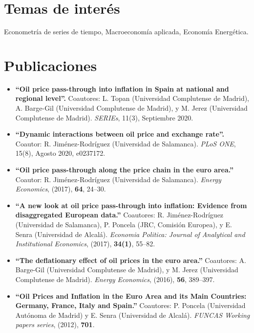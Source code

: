 \documentclass[11pt]{article}\usepackage[]{graphicx}\usepackage[]{color}
\begin{document}
{%
\section{Temas de interés}

Econometría de series de tiempo, Macroeconomía aplicada, Economía Energética.

\section{Publicaciones}

\begin{itemize}
  \item \textbf{``Oil price pass-through into inflation in Spain at national and regional level''.} Coautores: L. Topan (Universidad Complutense de Madrid), A. Barge-Gil (Universidad Complutense de Madrid), y M. Jerez (Universidad Complutense de Madrid). \emph{SERIEs}, 11(3), Septiembre 2020.
  \item \textbf{``Dynamic interactions between oil price and exchange rate''.} Coautor: R. Jiménez-Rodríguez (Universidad de Salamanca). \emph{PLoS ONE}, 15(8), Agosto 2020,  e0237172.
  \item \textbf{``Oil price pass-through along the price chain in the euro area.''} Coautor: R. Jiménez-Rodríguez (Universidad de Salamanca). \emph{Energy Economics}, (2017), \textbf{64}, 24--30.

\item \textbf{``A new look at oil price pass-through into inflation: Evidence from disaggregated European data.''} Coautores: R. Jiménez-Rodríguez (Universidad de  Salamanca), P. Poncela (JRC, Comisión Europea), y E. Senra (Universidad de Alcalá). \emph{Economia Politica: Journal of Analytical and Institutional Economics}, (2017), \textbf{34(1)}, 55--82.

\item \textbf{``The deflationary effect of oil prices in the euro area.''} Coautores: A. Barge-Gil (Universidad Complutense de Madrid), y M. Jerez (Universidad Complutense de Madrid). \emph{Energy Economics}, (2016), \textbf{56}, 389--397.

\item \textbf{``Oil Prices and Inflation in the Euro Area and its Main Countries: Germany, France, Italy and Spain.''} Coautores: P. Poncela (Universidad Autónoma de Madrid) y E. Senra (Universidad de Alcalá). \emph{FUNCAS Working papers series}, (2012), \textbf{701}.


\end{itemize}}
\end{document}
